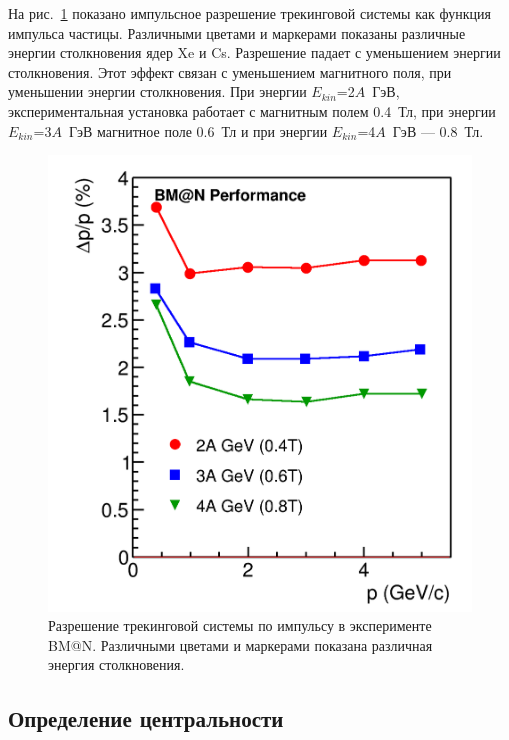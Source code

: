 На рис.~\ref{fig:bmn_mom_res} показано импульсное разрешение трекинговой системы как функция импульса частицы.
Различными цветами и маркерами показаны различные энергии столкновения ядер Xe и Cs.
Разрешение падает с уменьшением энергии столкновения. 
Этот эффект связан с уменьшением магнитного поля, при уменьшении энергии столкновения. 
При энергии $E_{kin}$=2$A$~ГэВ, экспериментальная установка работает с магнитным полем 0.4~Тл, при энергии $E_{kin}$=3$A$~ГэВ магнитное поле 0.6~Тл и при энергии $E_{kin}$=4$A$~ГэВ --- 0.8~Тл.
%
\begin{figure}[ht]
\begin{center}
\includegraphics[width=0.75\linewidth]{images/momentum_resolution.png}
\caption{Разрешение трекинговой системы по импульсу в эксперименте BM@N. Различными цветами и маркерами показана различная энергия столкновения.}
\label{fig:bmn_mom_res}
\end{center}
\end{figure}

\subsection{Определение центральности}

